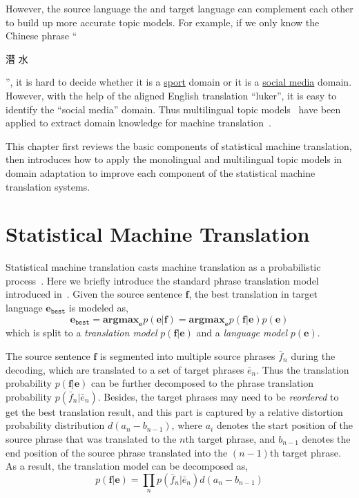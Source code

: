 However, the source language the and target language can complement
each other to build up more accurate topic models. For example, if we
only know the Chinese phrase ``\begin{CJK*}{UTF8}{gbsn}潜
  水\end{CJK*}'', it is hard to decide whether it is a
  \underline{sport} domain or it is a \underline{social media}
  domain. However, with the help of the aligned English translation
  ``luker'', it is easy to identify the ``social media'' domain. Thus
  multilingual topic models~\citep{mimno-09,boyd-graber-10} have been
  applied to extract domain knowledge for machine
  translation~\citep{hu-14}.

This chapter first reviews the basic components of statistical machine
translation, then introduces how to apply the monolingual and
multilingual topic models in domain adaptation to improve each
component of the statistical machine translation systems.

\section{Statistical Machine Translation}

Statistical machine translation casts machine translation as a
probabilistic process~\citep{koehn-09}. Here we briefly introduce the
standard phrase translation model introduced
in~\citep{koehn-03}. Given the source sentence $\mathbf{f}$, the best
translation in target language $\mathbf{e}_\texttt{best}$ is modeled
as,
\begin{equation}
\mathbf{e}_\texttt{best} = \textbf{argmax}_\mathbf{e} p(\mathbf{e}|\mathbf{f}) = \textbf{argmax}_\mathbf{e} p(\mathbf{f}|\mathbf{e}) p (\mathbf{e})
\end{equation}
which is split to a \textit{translation model}
$p(\mathbf{f}|\mathbf{e})$ and a \textit{language model} $p
(\mathbf{e})$.

The source sentence $\mathbf{f}$ is segmented into multiple source
phrases $\bar{f}_n$ during the decoding, which are translated to a set
of target phrases $\bar{e}_n$. Thus the translation probability
$p(\mathbf{f}|\mathbf{e})$ can be further decomposed to the phrase
translation probability $p(\bar{f}_n | \bar{e}_n)$. Besides, the
target phrases may need to be \textit{reordered} to get the best
translation result, and this part is captured by a relative distortion
probability distribution $d(a_n - b_{n-1})$, where $a_i$ denotes the
start position of the source phrase that was translated to the $n$th
target phrase, and $b_{n-1}$ denotes the end position of the source
phrase translated into the $(n-1)$th target phrase. As a result, the
translation model can be decomposed as,
\begin{equation}
p(\mathbf{f}|\mathbf{e}) = \prod_{n} p(\bar{f}_n | \bar{e}_n) d(a_n - b_{n-1})
\end{equation}

